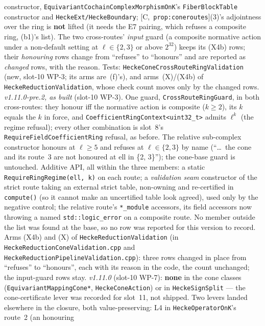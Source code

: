 \documentclass[11pt]{article}
\theoremstyle{remark}
\newcommand{\HA}[1]{[C,~\texttt{#1}]}      %
\begin{document}
\begin{enumerate}[label=(b\arabic*)]
\begin{itemize}
    constructor, \texttt{EquivariantCochainComplexMorphismOnK}'s \texttt{FiberBlockTable}
    constructor and \texttt{HeckeExt/HeckeBoundary}; \HA{prop:coneroutes}(3)'s adjointness over the
    ring is \textbf{not} lifted (it needs the E7 pairing, which refuses a composite ring, (b1)'s
    list). The two cross-routes' \emph{input} guard (a composite normative action under a
    non-default setting at $\ell\in\{2,3\}$ or above $2^{32}$) keeps its (X4b) rows; their
    \emph{honouring} rows change from ``refuses'' to ``honours'' and are reported as \emph{changed}
    rows, with the reason. Tests: \texttt{HeckeConeCrossRouteRingValidation} (new, slot-10 WP-3; its
    arms are~(f)'s), and arms~(X)/(X4b) of \texttt{HeckeReductionValidation}, whose check count
    moves only by the changed rows.
    \emph{v1.11.0-pre.2, as built} (slot-10 WP-3). One guard, \texttt{CrossRouteRingGuard}, in both
    cross-routes: they honour iff the normative action is composite ($k\ge2$), its $k$ equals the
    $k$ in force, and \texttt{CoefficientRingContext<uint32\_t>} admits $\ell^k$ (the regime
    refusal); every other combination is slot~8's \texttt{RequireFieldCoefficientRing} refusal, as
    before. The relative sub-complex constructor honours at $\ell\ge5$ and refuses at
    $\ell\in\{2,3\}$ by name (``\ldots\ the cone and its route~3 are not honoured at ell in
    \{2, 3\}''); the cone-base guard is untouched. Additive API, all within the three members: a
    static \texttt{RequireRingRegime(ell, k)} on each route; a \emph{validation seam} constructor of
    the strict route taking an external strict table, non-owning and re-certified in
    \texttt{compute()} (so it cannot make an uncertified table look agreed), used only by the
    negative control; the relative route's \texttt{*\_module} accessors, its field accessors now
    throwing a named \texttt{std::logic\_error} on a composite route. No member outside the list was
    found at the base, so no row was reported for this version to record. Arms (X4b) and (X) of
    \texttt{HeckeReductionValidation} (in \texttt{HeckeReductionConeValidation.cpp} and
    \texttt{HeckeReductionPipelineValidation.cpp}): three rows changed in place from ``refuses'' to
    ``honours'', each with its reason in the code, the count unchanged; the input-guard rows stay.
    \emph{v1.11.0} (slot-10 WP-7): \textbf{none} in the cone classes
    (\texttt{EquivariantMappingCone*}, \texttt{HeckeConeAction}) or in \texttt{HeckeSignSplit} ---
    the cone-certificate lever was recorded for slot~11, not shipped. Two levers landed elsewhere in
    the closure, both value-preserving: L4 in \texttt{HeckeOperatorOnK}'s route~2 (an honouring

\end{itemize}
\end{enumerate}
\end{document}
